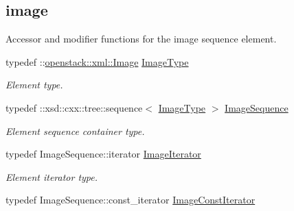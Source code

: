 \subsection*{image}
\label{_amgrp78805a221a988e79ef3f42d7c5bfd418}
Accessor and modifier functions for the image sequence element. \begin{DoxyCompactItemize}
\item 
\hypertarget{classopenstack_1_1xml_1_1Images_a0938d6821f3d493a6688f3d78e1d5b3c}{
typedef ::\hyperlink{classopenstack_1_1xml_1_1Image}{openstack::xml::Image} \hyperlink{classopenstack_1_1xml_1_1Images_a0938d6821f3d493a6688f3d78e1d5b3c}{ImageType}}
\label{classopenstack_1_1xml_1_1Images_a0938d6821f3d493a6688f3d78e1d5b3c}

\begin{DoxyCompactList}\small\item\em Element type. \item\end{DoxyCompactList}\item 
\hypertarget{classopenstack_1_1xml_1_1Images_af5703f22e0842ce76fb1afc5b52fd2cd}{
typedef ::xsd::cxx::tree::sequence$<$ \hyperlink{classopenstack_1_1xml_1_1Image}{ImageType} $>$ \hyperlink{classopenstack_1_1xml_1_1Images_af5703f22e0842ce76fb1afc5b52fd2cd}{ImageSequence}}
\label{classopenstack_1_1xml_1_1Images_af5703f22e0842ce76fb1afc5b52fd2cd}

\begin{DoxyCompactList}\small\item\em Element sequence container type. \item\end{DoxyCompactList}\item 
\hypertarget{classopenstack_1_1xml_1_1Images_add8117bb35e012e77ecde187e0f0aae5}{
typedef ImageSequence::iterator \hyperlink{classopenstack_1_1xml_1_1Images_add8117bb35e012e77ecde187e0f0aae5}{ImageIterator}}
\label{classopenstack_1_1xml_1_1Images_add8117bb35e012e77ecde187e0f0aae5}

\begin{DoxyCompactList}\small\item\em Element iterator type. \item\end{DoxyCompactList}\item 
\hypertarget{classopenstack_1_1xml_1_1Images_a71e6b440c0d5c8916b807a15483a6b84}{
typedef ImageSequence::const\_\-iterator \hyperlink{classopenstack_1_1xml_1_1Images_a71e6b440c0d5c8916b807a15483a6b84}{ImageConstIterator}}
\label{classopenstack_1_1xml_1_1Images_a71e6b440c0d5c8916b807a15483a6b84}


\end{DoxyCompactItemize}

